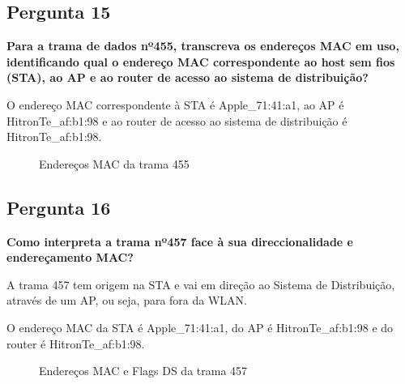 \documentclass[11pt]{article}
\begin{document}
\subsection{Pergunta 15}

\textbf{Para a trama de dados nº455, transcreva os endereços MAC em uso, identificando qual o endereço MAC correspondente ao host sem fios (STA), ao AP e ao router de acesso ao sistema de distribuição?}

O endereço MAC correspondente à STA é Apple\_71:41:a1, ao AP é HitronTe\_af:b1:98 e ao router de acesso ao sistema de distribuição é HitronTe\_af:b1:98.

\begin{figure}[hbt!]
    \centering
    \caption{Endereços MAC da trama 455}
\end{figure}
\clearpage
\subsection{Pergunta 16}

\textbf{Como interpreta a trama nº457 face à sua direccionalidade e endereçamento MAC?}

A trama 457 tem origem na STA e vai em direção ao Sistema de Distribuição, através de um AP, ou seja, para fora da WLAN.

O endereço MAC da STA é Apple\_71:41:a1, do AP é HitronTe\_af:b1:98 e do router é HitronTe\_af:b1:98.

\begin{figure}[hbt!]
    \centering
    \caption{Endereços MAC e Flags DS da trama 457}
\end{figure}
\end{document}
